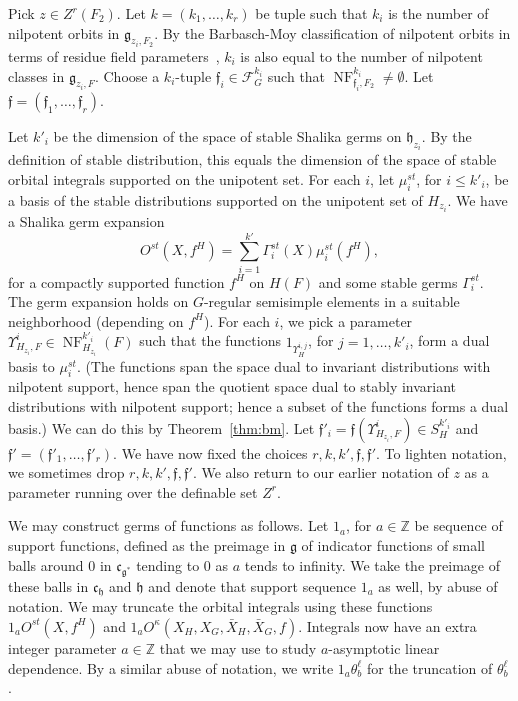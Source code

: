 \documentclass[12pt]{amsart}
\newcommand{\op}[1]{\operatorname{#1}}
\newcommand{\ring}[1]{{\mathbb #1}}
\def\NF{\op{NF}}
\def\Y{\Upsilon}
\def\s{{\mathfrak{f}}}
\newcommand{\cF}{\mathcal{F}}
\newcommand{\fg}{\mathfrak{g}}
\newcommand{\fc}{\mathfrak{c}}
\newcommand{\fh}{\mathfrak{h}}
\theoremstyle{plain}
\theoremstyle{definition}
\begin{document}
Pick $z\in Z^r(F_2)$.  Let $k=(k_1,\ldots,k_r)$ be tuple such that
$k_i$ is the number of nilpotent orbits in $\fg_{z_i,F_2}$.  By the
Barbasch-Moy classification of nilpotent orbits in terms of residue
field parameters~\cite{barbasch-moy}, $k_i$ is also equal to the
number of nilpotent classes in $\fg_{z_i,F}$.  Choose a $k_i$-tuple
$\s_i\in \cF_G^{k_i}$ such that $\NF^{k_i}_{\s_i,F_2}\ne
\emptyset$.  Let $\s = (\s_1,\ldots,\s_r)$.

Let $k'_i$ be the dimension of the space of stable Shalika germs on
$\fh_{z_i}$.  By the definition of stable distribution, this equals
the dimension of the space of stable orbital integrals supported on
the unipotent set.  For each $i$, let $\mu_i^{st}$, for $i\le k'_i$,
be a basis of the stable distributions supported on the unipotent set
of $H_{z_i}$.  We have a Shalika germ expansion
\[
O^{st}(X,f^H) = \sum_{i=1}^{k'} \Gamma^{st}_i(X) \mu_i^{st}(f^H),
\]
for a compactly supported function $f^H$ on $H(F)$ and some stable
germs $\Gamma^{st}_i$.  The germ
expansion holds on $G$-regular semisimple elements in a suitable
neighborhood (depending on $f^H$).  For each $i$, we pick a
parameter $\Y^i_{H_{z_i},F}\in \NF^{k'_i}_{H_{z_i}}(F)$ such
that the functions $1_{\Y_H^{i,j}}$, for $j=1,\ldots,k'_i$, form a
dual basis to $\mu_i^{st}$.  (The functions span the space dual to
invariant distributions with nilpotent support, hence span the
quotient space dual to stably invariant distributions with nilpotent
support; hence a subset of the functions forms a dual basis.)  We can
do this by Theorem~\ref{thm:bm}.  Let $\s'_i = \s(\Y^i_{H_{z_i},F})\in
S^{k'_i}_{H}$ and $\s' = (\s'_1,\ldots,\s'_r)$.  We have now fixed the
choices $r,k,k',\s,\s'$.  To lighten notation, we sometimes drop
$r,k,k',\s,\s'$.  We also return to our earlier notation of $z$ as a
parameter running over the definable set $Z^r$.

We may construct germs of functions as follows.  Let $1_a$, for
$a\in\ring{Z}$ be sequence of support functions, defined as the
preimage in $\fg$ of
indicator functions of small balls around $0$ in $\fc_{\fg^*}$ tending to $0$
as $a$ tends to infinity.  We take the preimage of these balls in
$\fc_{\fh}$ and $\fh$ and
denote that support sequence $1_a$ as well, by abuse of notation.  We may truncate the
orbital integrals using these functions $1_a O^{st}(X,f^H)$ and $1_a
O^\kappa(X_H,X_G,\bar X_H,\bar X_G,f)$.  Integrals now have an extra
integer parameter $a\in\ring{Z}$ that we may use to study
$a$-asymptotic linear dependence.   By a similar abuse of notation, we
write $1_a\theta^\ell_b$
for the truncation of $\theta^\ell_b$.
\end{document}
